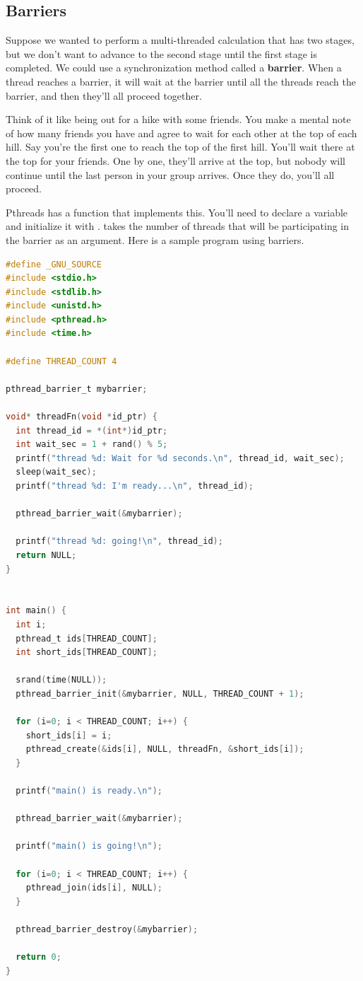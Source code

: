 \subsection{Barriers}

Suppose we wanted to perform a multi-threaded calculation that has two stages, but we don't want to advance to the second stage until the first stage is completed.
We could use a synchronization method called a \textbf{barrier}. When a thread reaches a barrier, it will wait at the barrier until all the threads reach the barrier, and then they'll all proceed together.

Think of it like being out for a hike with some friends.
You make a mental note of how many friends you have and agree to wait for each other at the top of each hill.
Say you're the first one to reach the top of the first hill.
You'll wait there at the top for your friends.
One by one, they'll arrive at the top, but nobody will continue until the last person in your group arrives.
Once they do, you'll all proceed.

Pthreads has a function  that implements this.
You'll need to declare a  variable and initialize it with .
 takes the number of threads that will be participating in the barrier as an argument.
Here is a sample program using barriers.

\begin{lstlisting}[language=C]
#define _GNU_SOURCE
#include <stdio.h>
#include <stdlib.h>
#include <unistd.h>
#include <pthread.h>
#include <time.h>

#define THREAD_COUNT 4

pthread_barrier_t mybarrier;

void* threadFn(void *id_ptr) {
  int thread_id = *(int*)id_ptr;
  int wait_sec = 1 + rand() % 5;
  printf("thread %d: Wait for %d seconds.\n", thread_id, wait_sec);
  sleep(wait_sec);
  printf("thread %d: I'm ready...\n", thread_id);

  pthread_barrier_wait(&mybarrier);

  printf("thread %d: going!\n", thread_id);
  return NULL;
}


int main() {
  int i;
  pthread_t ids[THREAD_COUNT];
  int short_ids[THREAD_COUNT];

  srand(time(NULL));
  pthread_barrier_init(&mybarrier, NULL, THREAD_COUNT + 1);

  for (i=0; i < THREAD_COUNT; i++) {
    short_ids[i] = i;
    pthread_create(&ids[i], NULL, threadFn, &short_ids[i]);
  }

  printf("main() is ready.\n");

  pthread_barrier_wait(&mybarrier);

  printf("main() is going!\n");

  for (i=0; i < THREAD_COUNT; i++) {
    pthread_join(ids[i], NULL);
  }

  pthread_barrier_destroy(&mybarrier);

  return 0;
}
\end{lstlisting}


